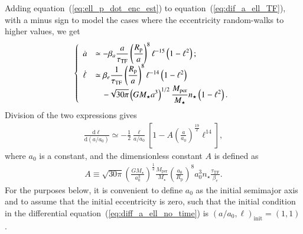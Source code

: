\documentclass[iop,usenatbib]{emulateapj}
\newcommand{\mper}{M_\mathrm{per}}
\begin{document}
Adding equation~(\ref{eq:ell_p_dot_enc_est}) to equation~(\ref{eq:dif_a_ell_TF}), with a minus sign to model the cases where the eccentricity random-walks to higher values, we get
\begin{align}
\label{eq:dif_a_ell}
\left \{
\begin{array}{l>{\displaystyle}l}
\dot{a} &\simeq - \beta_a \frac{a}{\tau_\mathrm{TF}} \left ( \frac{R_\mathrm{p}}{a} \right )^8 \ell^{-15} \left(1-\ell^2 \right ); \\
\dot{\ell} &\simeq \beta_e \frac{1}{\tau_\mathrm{TF}} \left ( \frac{R_\mathrm{p}}{a} \right )^8 \ell^{-14} \left(1-\ell^2 \right ) \\
&\quad- \sqrt{30\pi} \left ( G M_\star a^3 \right )^{1/2} \frac{\mper}{M_\star} n_\star \left(1-\ell^2 \right ). \\
\end{array}
\right .
\end{align}
Division of the two expressions gives
\begin{align}
\label{eq:diff_a_ell_no_time}
\frac{\mathrm{d} \ell}{\mathrm{d} (a/a_{0})} \simeq - \frac{1}{2} \frac{\ell}{a/a_{0}} \left [ 1 - A \left (\frac{a}{a_{0}} \right )^\frac{19}{2} \ell^{14} \right ],
\end{align}
where $a_{0}$ is a constant, and the dimensionless constant $A$ is defined as
\begin{align}
A \equiv \sqrt{30\pi} \left ( \frac{G M_\star}{a_{0}^3} \right )^\frac{1}{2} \frac{\mper}{M_\star} \left ( \frac{a_{0}}{R_\mathrm{p}} \right )^8 a_{0}^3 n_\star \frac{\tau_\mathrm{TF}}{\beta_e}.
\end{align}
For the purposes below, it is convenient to define $a_{0}$ as the initial semimajor axis and to assume that the initial eccentricity is zero, such that the initial condition in the differential equation~(\ref{eq:diff_a_ell_no_time}) is $(a/a_0,\ell)_\mathrm{init} = (1,1)$. 
\end{document}
